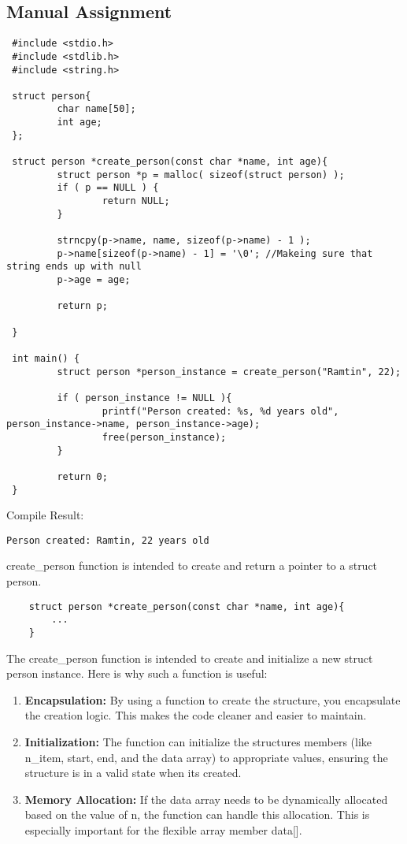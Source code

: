 \subsection{Manual Assignment}


\begin{lstlisting}
 #include <stdio.h>
 #include <stdlib.h>
 #include <string.h>

 struct person{
         char name[50];
         int age;
 };

 struct person *create_person(const char *name, int age){
         struct person *p = malloc( sizeof(struct person) );
         if ( p == NULL ) {
                 return NULL;
         }

         strncpy(p->name, name, sizeof(p->name) - 1 );
         p->name[sizeof(p->name) - 1] = '\0'; //Makeing sure that string ends up with null
         p->age = age;

         return p;

 }

 int main() {
         struct person *person_instance = create_person("Ramtin", 22);

         if ( person_instance != NULL ){
                 printf("Person created: %s, %d years old", person_instance->name, person_instance->age);
                 free(person_instance);
         }

         return 0;
 }

\end{lstlisting}

Compile Result:
\begin{lstlisting}
Person created: Ramtin, 22 years old
\end{lstlisting}




create\_person function is intended to create and return a pointer to a struct person.
\newline
\begin{verbatim}
    struct person *create_person(const char *name, int age){
        ...
    }
\end{verbatim}
The create\_person function is intended to create and initialize a new struct person instance.
Here is why such a function is useful:


\begin{enumerate}
\item \textbf{Encapsulation: } By using a function to create the structure, you encapsulate the creation logic. This makes the code cleaner and easier to maintain.
\item \textbf{Initialization: } The function can initialize the structure\textquotesingle s members (like n\_item, start, end, and the data array)
 to appropriate values, ensuring the structure is in a valid state when it\textquotesingle s created.
\item \textbf{Memory Allocation: } If the data array needs to be dynamically allocated based on the value of n, the function can handle this allocation. This is especially important for the flexible array member data[].
\end{enumerate}


